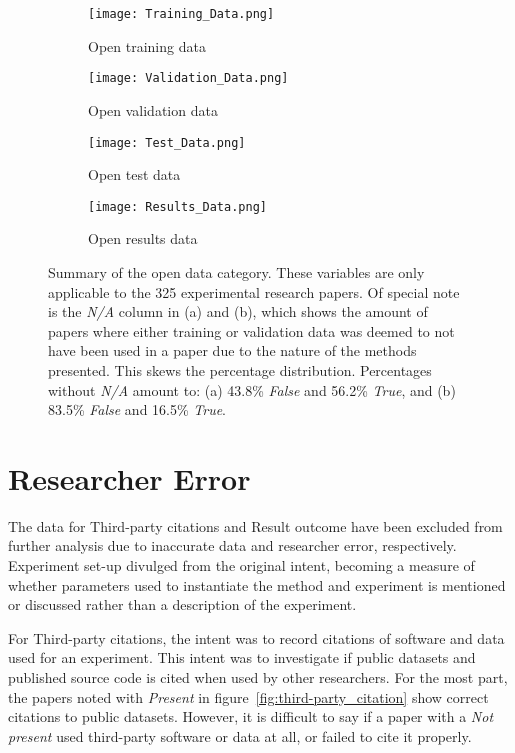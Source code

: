 \begin{figure}[!h]
\begin{center}
    \begin{subfigure}[b]{0.4\textwidth}
        \texttt{[image: Training\_Data.png]}
        \caption{Open training data}
        \label{fig:training}
    \end{subfigure}
    \begin{subfigure}[b]{0.4\textwidth}
        \texttt{[image: Validation\_Data.png]}
        \caption{Open validation data}
        \label{fig:validation}
    \end{subfigure}
    \begin{subfigure}[b]{0.4\textwidth}
        \texttt{[image: Test\_Data.png]}
        \caption{Open test data}
        \label{fig:test}
    \end{subfigure}
    \begin{subfigure}[b]{0.4\textwidth}
        \texttt{[image: Results\_Data.png]}
        \caption{Open results data}
        \label{fig:results}
    \end{subfigure}
    \caption[Summary of the open data category.]{Summary of the open data category. These variables are only applicable to the 325 experimental research papers. Of special note is the \emph{N/A} column in (a) and (b), which shows the amount of papers where either training or validation data was deemed to not have been used in a paper due to the nature of the methods presented. This skews the percentage distribution. Percentages without \emph{N/A} amount to: (a) 43.8\% \emph{False} and 56.2\% \emph{True}, and (b) 83.5\% \emph{False} and 16.5\% \emph{True}.}
    \label{fig:open_data}
\end{center}
\end{figure}

\section{Researcher Error}
\label{sec:researcher_error}
The data for Third-party citations and Result outcome have been excluded from further analysis due to inaccurate data and researcher error, respectively. Experiment set-up divulged from the original intent, becoming a measure of whether parameters used to instantiate the method and experiment is mentioned or discussed rather than a description of the experiment.

For Third-party citations, the intent was to record citations of software and data used for an experiment. This intent was to investigate if public datasets and published source code is cited when used by other researchers. For the most part, the papers noted with \emph{Present} in figure~\ref{fig:third-party_citation} show correct citations to public datasets. However, it is difficult to say if a paper with a \emph{Not present} used third-party software or data at all, or failed to cite it properly.

